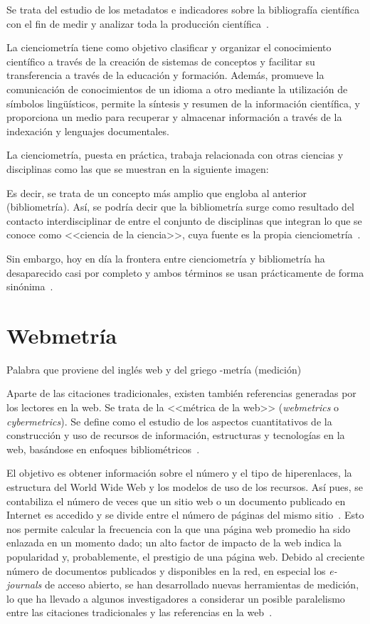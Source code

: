 Se trata del estudio de los metadatos e indicadores sobre la bibliografía científica con el fin de medir y analizar toda la producción científica~\cite{Amat1989}.

La cienciometría tiene como objetivo clasificar y organizar el conocimiento científico a través de la creación de sistemas de conceptos y facilitar su transferencia a través de la educación y formación. Además, promueve la comunicación de conocimientos de un idioma a otro mediante la utilización de símbolos lingüísticos, permite la síntesis y resumen de la información científica, y proporciona un medio para recuperar y almacenar información a través de la indexación y lenguajes documentales.

La cienciometría, puesta en práctica, trabaja relacionada con otras ciencias y disciplinas como las que se muestran en la siguiente imagen:

Es decir, se trata de un concepto más amplio que engloba al anterior (bibliometría). Así, se podría decir que la bibliometría surge como resultado del contacto interdisciplinar de entre el conjunto de disciplinas que integran lo que se conoce como <<ciencia de la ciencia>>, cuya fuente es la propia cienciometría~\cite{Amat1989}.

Sin embargo, hoy en día la frontera entre cienciometría y bibliometría ha desaparecido casi por completo y ambos términos se usan prácticamente de forma sinónima~\cite{Vitanov2016}.

\section{Webmetría}

Palabra que proviene del inglés web y del griego -metría (medición)

Aparte de las citaciones tradicionales, existen también referencias generadas por los lectores en la web. Se trata de la <<métrica de la web>> (\textit{webmetrics} o \textit{cybermetrics}). Se define como el estudio de los aspectos cuantitativos de la construcción y uso de recursos de información, estructuras y tecnologías en la web, basándose en enfoques bibliométricos~\cite{bjorneborn2004}. 


El objetivo es obtener información sobre el número y el tipo de hiperenlaces, la estructura del World Wide Web y los modelos de uso de los recursos. Así pues, se contabiliza el número de veces que un sitio web o un documento publicado en Internet es accedido y se divide entre el número de páginas del mismo sitio~\cite{Turbanti2017}. Esto nos permite calcular la frecuencia con la que una página web promedio ha sido enlazada en un momento dado; un alto factor de impacto de la web indica la popularidad y, probablemente, el prestigio de una página web. Debido al creciente número de documentos publicados y disponibles en la red, en especial los \textit{e-journals} de acceso abierto, se han desarrollado nuevas herramientas de medición, lo que ha llevado a algunos investigadores a considerar un posible paralelismo entre las citaciones tradicionales y las referencias en la web~\cite{Turbanti2017}.

